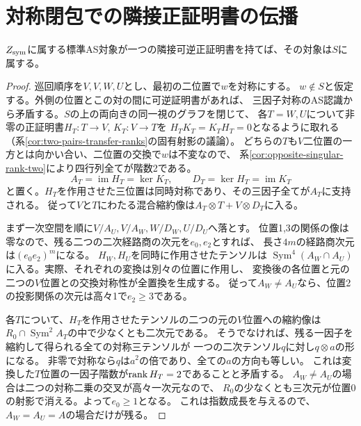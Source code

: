\section{対称閉包での隣接正証明書の伝播}
\label{sec:adjacent-witness-boundary}
\begin{theorem}[対称閉包内での一つの隣接正証明書]\label{thm:one-adjacent-AS-in-symmetric-closure}
$Z_{\rm sym}$に属する標準AS対象が一つの隣接可逆正証明書を持てば、その対象は$S$に属する。
\end{theorem}
\begin{proof}
巡回順序を$V,V,W,U$とし、最初の二位置で$w$を対称にする。
$w\notin S$と仮定する。外側の位置とこの対の間に可逆証明書があれば、
三因子対称のAS認識から矛盾する。$S$の上の両向きの同一視のグラフを閉じて、
各$T=W,U$について非零の正証明書$H_T:T\to V$, $K_T:V\to T$を
$H_TK_T=K_TH_T=0$となるように取れる
（系\ref{cor:two-pairs-transfer-ranks}の固有射影の議論）。
どちらの$T$も$V$二位置の一方とは向かい合い、二位置の交換で$w$は不変なので、
系\ref{cor:opposite-singular-rank-two}により四行列全てが階数2である。
\[
 A_T=\operatorname{im} H_T=\ker K_T,\qquad D_T=\ker H_T=\operatorname{im}K_T
\]
と置く。$H_T$を作用させた三位置は同時対称であり、その三因子全てが$A_T$に支持される。
従って$V$と$T$にわたる混合縮約像は$A_T\otimes T+V\otimes D_T$に入る。

まず一次空間を順に$V/A_U,V/A_W,W/D_W,U/D_U$へ落とす。
位置1,3の関係の像は零なので、残る二つの二次経路商の次元を$e_0,e_2$とすれば、
長さ$4m$の経路商次元は$(e_0e_2)^m$になる。
$H_W,H_U$を同時に作用させたテンソルは
$\operatorname{Sym}^4(A_W\cap A_U)$に入る。実際、それぞれの変換は別々の位置に作用し、
変換後の各位置と元の二つの$V$位置との交換対称性が全置換を生成する。
従って$A_W\ne A_U$なら、位置2の投影関係の次元は高々1で$e_2\ge3$である。

各$T$について、$H_T$を作用させたテンソルの二つの元の$V$位置への縮約像は
$R_0\cap\operatorname{Sym}^2 A_T$の中で少なくとも二次元である。
そうでなければ、残る一因子を縮約して得られる全ての対称三テンソルが
一つの二次テンソル$q$に対し$q\otimes a$の形になる。
非零で対称なら$q$は$a^2$の倍であり、全ての$a$の方向も等しい。
これは変換した$T$位置の一因子階数が$\operatorname{rank} H_T=2$であることと矛盾する。
$A_W\ne A_U$の場合は二つの対称二乗の交叉が高々一次元なので、
$R_0$の少なくとも三次元が位置0の射影で消える。よって$e_0\ge1$となる。
これは指数成長を与えるので、$A_W=A_U=A$の場合だけが残る。


\end{proof}
